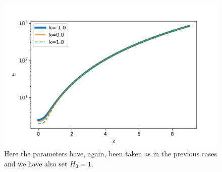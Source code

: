 \documentclass[a4paper, 11pt]{FSKH_623_Report}
\numberwithin{equation}{section}
\begin{document}
\begin{figure}[H]
\centering
\includegraphics[scale=0.9]{Figures/ch_H.jpg}
\caption{Here the parameters have, again, been taken as in the previous cases and we have also set $H_{0}=1$.}
\label{fig:ChH}
\end{figure}
\end{document}
